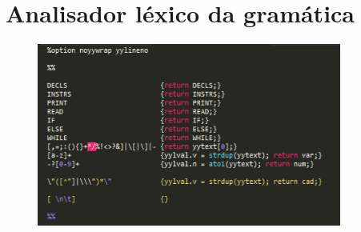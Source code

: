 \documentclass{report}
\begin{document}
\section{Analisador léxico da gramática}
\begin{figure}[ht]
\centering
\includegraphics[width=100mm, scale=0.5]{flex.png}
\end{figure}
\end{document}

